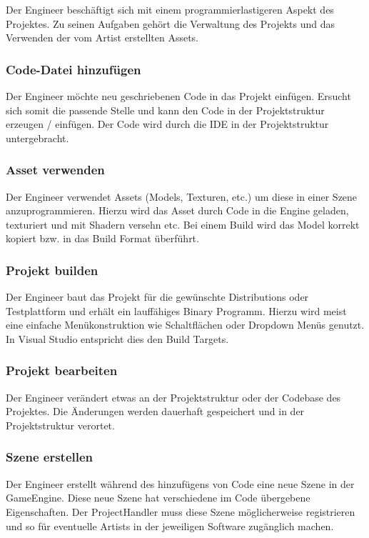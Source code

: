 \documentclass[pagesize, paper=a4, fontsize=12pt, titlepage=true, headings=small, headnosepline, abstractoff, liststotoc, nochapterprefix, plainheadsepline, twoside]{scrreprt}
\begin{document}
Der Engineer beschäftigt sich mit einem programmierlastigeren Aspekt des Projektes. Zu seinen Aufgaben gehört die Verwaltung des Projekts und das Verwenden der vom Artist erstellten Assets.

\subsubsection{Code-Datei hinzufügen}
Der Engineer möchte neu geschriebenen Code in das Projekt einfügen. Ersucht sich somit die passende Stelle und kann den Code in der Projektstruktur erzeugen / einfügen. Der Code wird durch die IDE in der Projektstruktur untergebracht.

\subsubsection{Asset verwenden}
Der Engineer verwendet Assets (Models, Texturen, etc.) um diese in einer Szene anzuprogrammieren. Hierzu wird das Asset durch Code in die Engine geladen, texturiert und mit Shadern versehn etc. Bei einem Build wird das Model korrekt kopiert bzw. in das Build Format überführt.

\subsubsection{Projekt builden}
Der Engineer baut das Projekt für die gewünschte Distributions oder Testplattform und erhält ein lauffähiges Binary Programm. Hierzu wird meist eine einfache Menükonstruktion wie Schaltflächen oder Dropdown Menüs genutzt. In Visual Studio entspricht dies den Build Targets.

\subsubsection{Projekt bearbeiten}
Der Engineer verändert etwas an der Projektstruktur oder der Codebase des Projektes. Die Änderungen werden dauerhaft gespeichert und in der Projektstruktur verortet.

\subsubsection{Szene erstellen}
Der Engineer erstellt während des hinzufügens von Code eine neue Szene in der GameEngine. Diese neue Szene hat verschiedene im Code übergebene Eigenschaften. Der ProjectHandler muss diese Szene möglicherweise registrieren und so für eventuelle Artists in der jeweiligen Software zugänglich machen.
\end{document}
